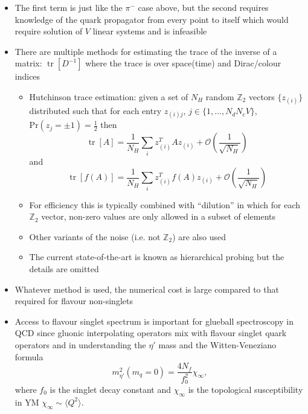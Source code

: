 \begin{itemize}
    \item The first term is just like the $\pi^-$ case above, but the second requires knowledge of the quark propagator from every point to itself which would require solution of $V$ linear systems and is infeasible
    \item There are multiple methods for estimating the trace of the inverse of a matrix: $\operatorname{tr}[D^{-1}]$ where the trace is over space(time) and Dirac/colour indices
    \begin{itemize}
        \item Hutchinson trace estimation: given a set of $N_H$ random $\mathbb{Z}_2$ vectors $\{z_{(i)}\}$ distributed such that for each entry $z_{(i)j}$, $j \in \{ 1, \ldots, N_d N_c V \}$, $\text{Pr}(z_j = \pm 1) = \frac{1}{2}$ then
        \begin{equation}
            \operatorname{tr}[A] = \frac{1}{N_H}\sum_i z_{(i)}^T A z_{(i)} + \mathcal{O}(\frac{1}{\sqrt{N_H}})
        \end{equation}
        and
        \begin{equation}
            \operatorname{tr}[f(A)] = \frac{1}{N_H}\sum_i z_{(i)}^T f(A) z_{(i)} + \mathcal{O}(\frac{1}{\sqrt{N_H}})
        \end{equation}
        \item For efficiency this is typically combined with ``dilution'' in which for each $\mathbb{Z}_2$ vector, non-zero values are only allowed in a subset of elements
        \item Other variants of the noise (i.e. not $\mathbb{Z}_2$) are also used
        \item The current state-of-the-art is known as hierarchical probing but the details are omitted
    \end{itemize}
    \item Whatever method is used, the numerical cost is large compared to that required for flavour non-singlets
    \item Access to flavour singlet spectrum is important for glueball spectroscopy in QCD since gluonic interpolating operators mix with flavour singlet quark operators and in understanding the $\eta'$ mass and the Witten-Veneziano formula
    \begin{equation}
        m_{\eta'}^2(m_q = 0) = \frac{4 N_f}{f_0^2}\chi_\infty,
    \end{equation}
    where $f_0$ is the singlet decay constant and $\chi_\infty$ is the topological susceptibility in YM $\chi_\infty \sim \langle Q^2 \rangle$.
\end{itemize}

